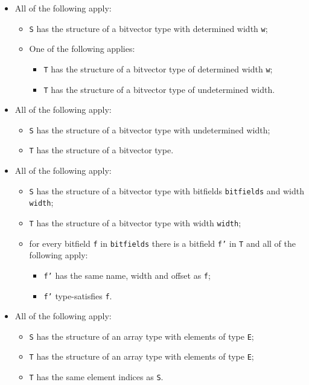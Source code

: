 \documentclass{book}
\begin{document}
\begin{itemize}
  \item All of the following apply:
    \begin{itemize}
    \item \texttt{S} has the structure of a bitvector type with determined width \texttt{w};
    \item One of the following applies:
      \begin{itemize}
      \item \texttt{T} has the structure of a bitvector type of determined width \texttt{w};
      \item \texttt{T} has the structure of a bitvector type of undetermined width.
      \end{itemize}
    \end{itemize}

  \item All of the following apply:
    \begin{itemize}
    \item \texttt{S} has the structure of a bitvector type with undetermined width;
    \item \texttt{T} has the structure of a bitvector type.
    \end{itemize}

  \item All of the following apply:
    \begin{itemize}
    \item \texttt{S} has the structure of a bitvector type with bitfields \texttt{bitfields} and width \texttt{width};
    \item \texttt{T} has the structure of a bitvector type with width \texttt{width};
    \item for every bitfield \texttt{f} in \texttt{bitfields} there is a bitfield \texttt{f'} in \texttt{T} and
      all of the following apply:
      \begin{itemize}
      \item \texttt{f'} has the same name, width and offset as \texttt{f};
      \item \texttt{f'} type-satisfies \texttt{f}.
      \end{itemize}
    \end{itemize}

  \item All of the following apply:
    \begin{itemize}
    \item \texttt{S} has the structure of an array type with elements of type \texttt{E};
    \item \texttt{T} has the structure of an array type with elements of type \texttt{E};
    \item \texttt{T} has the same element indices as \texttt{S}.
    \end{itemize}


\end{itemize}
\end{document}
